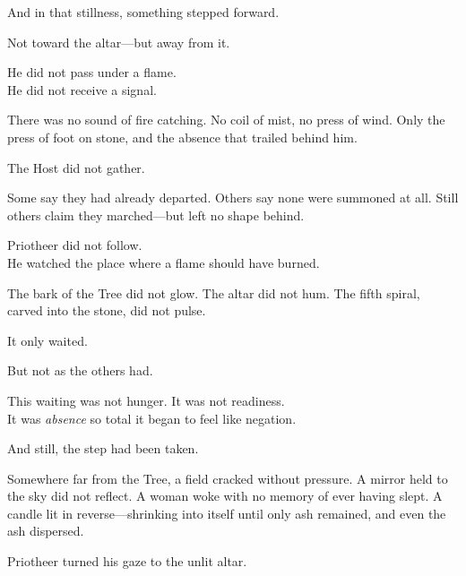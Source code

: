 \documentclass[9pt]{article}
\begin{document}
\vspace{0.5em}
And in that stillness, something stepped forward.

\vspace{0.5em}
Not toward the altar---but away from it.

\vspace{0.5em}
He did not pass under a flame.\\
He did not receive a signal.

\vspace{0.5em}
There was no sound of fire catching. No coil of mist, no press of wind. Only the press of foot on stone, and the absence that trailed behind him.

\vspace{0.5em}
The Host did not gather.

\vspace{0.5em}
Some say they had already departed. Others say none were summoned at all. Still others claim they marched---but left no shape behind.

\vspace{0.5em}
Priotheer did not follow.\\
He watched the place where a flame should have burned.

\vspace{0.5em}
The bark of the Tree did not glow. The altar did not hum. The fifth spiral, carved into the stone, did not pulse.

\vspace{0.5em}
It only waited.

\vspace{0.5em}
But not as the others had.

\vspace{0.5em}
This waiting was not hunger. It was not readiness.\\
It was \textit{absence} so total it began to feel like negation.

\vspace{0.5em}
And still, the step had been taken.

\vspace{0.5em}
Somewhere far from the Tree, a field cracked without pressure. A mirror held to the sky did not reflect. A woman woke with no memory of ever having slept. A candle lit in reverse---shrinking into itself until only ash remained, and even the ash dispersed.

\vspace{0.5em}
Priotheer turned his gaze to the unlit altar.
\end{document}
